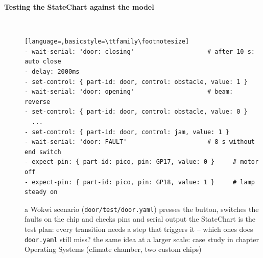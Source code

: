 \begin{description}
\item[{\rot\bf Testing the StateChart against the model}]~\\[-\lstskip]
\begin{lstlisting}[language=,basicstyle=\ttfamily\footnotesize]
- wait-serial: 'door: closing'                    # after 10 s: auto close
- delay: 2000ms
- set-control: { part-id: door, control: obstacle, value: 1 }
- wait-serial: 'door: opening'                    # beam: reverse
- set-control: { part-id: door, control: obstacle, value: 0 }
  ...
- set-control: { part-id: door, control: jam, value: 1 }
- wait-serial: 'door: FAULT'                      # 8 s without end switch
- expect-pin: { part-id: pico, pin: GP17, value: 0 }     # motor off
- expect-pin: { part-id: pico, pin: GP18, value: 1 }     # lamp steady on
\end{lstlisting}
\bi
	\ite a Wokwi scenario (\texttt{door/test/door.yaml}) presses the button, switches the faults on the chip and checks pins and serial output
	\ite the StateChart is the test plan: every transition needs a step that triggers it -- which ones does \texttt{door.yaml} still miss?
	\ite the same idea at a larger scale: case study in chapter Operating Systems (climate chamber, two custom chips)
\ei
\os{\newpage}


\end{description}
